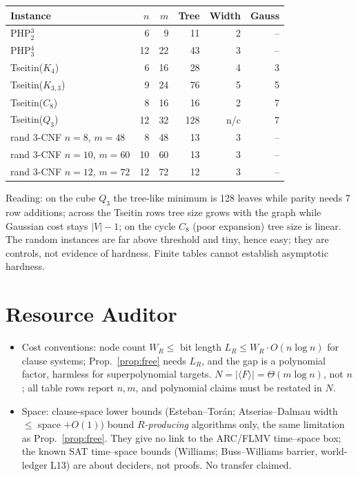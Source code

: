 \documentclass[11pt]{article}
\theoremstyle{definition}
\begin{document}
\begin{center}\begin{tabular}{lrrrrr}\toprule
Instance & $n$ & $m$ & Tree & Width & Gauss\\\midrule
PHP$^3_2$ & 6 & 9 & 11 & 2 & --\\
PHP$^4_3$ & 12 & 22 & 43 & 3 & --\\
Tseitin($K_4$) & 6 & 16 & 28 & 4 & 3\\
Tseitin($K_{3,3}$) & 9 & 24 & 76 & 5 & 5\\
Tseitin($C_8$) & 8 & 16 & 16 & 2 & 7\\
Tseitin($Q_3$) & 12 & 32 & 128 & n/c & 7\\
rand 3-CNF $n{=}8$, $m{=}48$ & 8 & 48 & 13 & 3 & --\\
rand 3-CNF $n{=}10$, $m{=}60$ & 10 & 60 & 13 & 3 & --\\
rand 3-CNF $n{=}12$, $m{=}72$ & 12 & 72 & 12 & 3 & --\\\bottomrule
\end{tabular}\end{center}

Reading: on the cube $Q_3$ the tree-like minimum is 128 leaves while parity
needs 7 row additions; across the Tseitin rows tree size grows with the
graph while Gaussian cost stays $|V|-1$; on
the cycle $C_8$ (poor expansion) tree size is linear. The random instances
are far above threshold and tiny, hence easy; they are controls, not evidence
of hardness. Finite tables cannot establish asymptotic hardness.

\section{Resource Auditor}
\begin{itemize}
\item Cost conventions: node count $W_R\le$ bit length $L_R\le W_R\cdot O(n\log n)$
for clause systems; Prop.~\ref{prop:free} needs $L_R$, and the gap is a
polynomial factor, harmless for superpolynomial targets. $N=|\langle F\rangle|
=\Theta(m\log n)$, not $n$; all table rows report $n,m$, and polynomial claims
must be restated in $N$.
\item Space: clause-space lower bounds (Esteban--Tor\'an; Atserias--Dalmau
width $\le$ space $+O(1)$) bound \emph{$R$-producing} algorithms only, the same
limitation as Prop.~\ref{prop:free}. They give no link to the ARC/FLMV
time--space box; the known SAT time--space bounds (Williams; Buss--Williams
barrier, world-ledger L13) are about deciders, not proofs. No transfer claimed.
\end{itemize}
\end{document}
